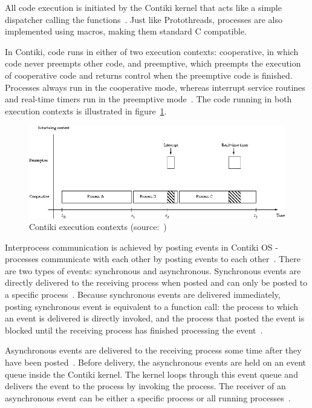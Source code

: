 All code execution is initiated by the Contiki kernel
that acts like a simple dispatcher calling the functions~\cite{contiki-docs}.
Just like Protothreads, processes are also implemented using macros,
making them standard C compatible.

In Contiki, code runs in either of two execution contexts:
cooperative, in which code never preempts other code, and preemptive,
which preempts the execution of cooperative code and returns control
when the preemptive code is finished.
Processes always run in the cooperative mode,
whereas interrupt service routines and real-time timers run in the preemptive mode~\cite{contiki-wiki-processes}.
The code running in both execution contexts is illustrated in figure~\ref{fig:contiki-execution-context}.

\begin{figure}
  \centering
  \includegraphics[width=13cm,keepaspectratio]{fig/Execution-contexts.png}
  \caption{Contiki execution contexts (source:~\cite{contiki-wiki-processes})}
  \label{fig:contiki-execution-context}
\end{figure}

Interprocess communication is achieved by posting events in Contiki OS -
processes communicate with each other by posting events to each other~\cite{paper-contiki}.
There are two types of events: synchronous and asynchronous.
Synchronous events are directly delivered to the receiving process when posted and
can only be posted to a specific process~\cite{contiki-wiki-processes}.
Because synchronous events are delivered immediately,
posting synchronous event is equivalent to a function call:
the process to which an event is delivered is directly invoked,
and the process that posted the event is blocked
until the receiving process has finished processing the event~\cite{contiki-wiki-processes}.

Asynchronous events are delivered to the receiving process
some time after they have been posted~\cite{contiki-wiki-processes}.
Before delivery, the asynchronous events are held on an event queue inside the Contiki kernel.
The kernel loops through this event queue and delivers
the event to the process by invoking the process.
The receiver of an asynchronous event can be either a specific process
or all running processes~\cite{contiki-wiki-processes}.
